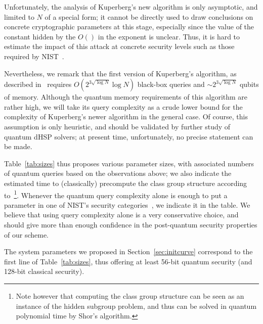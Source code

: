 \documentclass{llncs}
\renewcommand{\O}{\mathcal{O}}
\begin{document}
Unfortunately, the analysis of Kuperberg's new algorithm is only asymptotic, 
and limited to $N$ of a special form; it cannot be directly used
to draw conclusions on concrete cryptographic parameters at this stage,
especially since the value of the constant hidden by the $O()$ in the
exponent is unclear.
Thus, it is hard to estimate the impact of this attack
at concrete security levels
such as those required by NIST~\cite{NIST2016}.

Nevertheless, we remark that the first version of Kuperberg's
algorithm, as described in~\cite[Algorithm~5.1 and
Remark~5.2]{regev04} requires $O(2^{3\sqrt{\log N}}\log N)$ black-box
queries and $\sim 2^{3\sqrt{\log N}}$ qubits of memory.  Although the
quantum memory requirements of this algorithm are rather high, we will
take its query complexity as a crude lower bound for the complexity of
Kuperberg's newer algorithm in the general case.  Of course, this
assumption is only heuristic, and should be validated by further study
of quantum dHSP solvers; at present time, unfortunately, no precise
statement can be made.

Table~\ref{tab:sizes} thus proposes various parameter sizes, with
associated numbers of quantum queries based on the observations above;
we also indicate the estimated time to (classically) precompute the
class group structure according
to~\cite{10.1007/978-3-642-14081-5_15}\footnote{Note however that
  computing the class group structure can be seen as an instance of
  the hidden subgroup problem, and thus can be solved in quantum
  polynomial time by Shor's algorithm.}.  Whenever the quantum query
complexity alone is enough to put a parameter in one of NIST's
security categories~\cite{NIST2016}, we indicate it in the table. We
believe that using query complexity alone is a very conservative
choice, and should give more than enough confidence in the
post-quantum security properties of our scheme.

The system parameters we proposed in Section~\ref{sec:initcurve}
correspond to the first line of Table~\ref{tab:sizes}, 
thus offering at least 56-bit quantum security 
(and 128-bit classical security).

\end{document}
